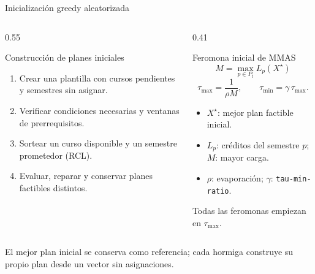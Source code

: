 \begin{frame}{Inicialización greedy aleatorizada}
  \small
  \begin{columns}[T,onlytextwidth]
    \begin{column}{0.55\textwidth}
      \begin{block}{Construcción de planes iniciales}
        \begin{enumerate}
          \item Crear una plantilla con cursos pendientes y semestres sin asignar.
          \item Verificar condiciones necesarias y ventanas de prerrequisitos.
          \item Sortear un curso disponible y un semestre prometedor (RCL).
          \item Evaluar, reparar y conservar planes factibles distintos.
        \end{enumerate}
      \end{block}
    \end{column}
    \begin{column}{0.41\textwidth}
      \begin{exampleblock}{Feromona inicial de MMAS}
        \[M=\max_{p\in P_t}L_p(X^{\star})\]
        \[\tau_{\max}=\frac{1}{\rho M},\qquad
          \tau_{\min}=\gamma\,\tau_{\max}.\]
        \begin{itemize}
          \item $X^{\star}$: mejor plan factible inicial.
          \item $L_p$: créditos del semestre $p$; $M$: mayor carga.
          \item $\rho$: evaporación; $\gamma$: \texttt{tau-min-ratio}.
        \end{itemize}
        Todas las feromonas empiezan en $\tau_{\max}$.
      \end{exampleblock}
    \end{column}
  \end{columns}
  \vspace{0.2cm}
  {\footnotesize El mejor plan inicial se conserva como referencia; cada hormiga
  construye su propio plan desde un vector sin asignaciones.}
\end{frame}
